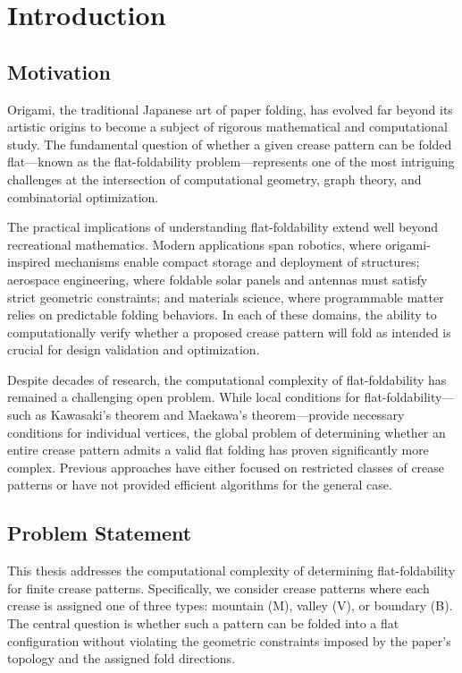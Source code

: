 \chapter{Introduction}

\section{Motivation}

Origami, the traditional Japanese art of paper folding, has evolved far beyond its artistic origins to become a subject of rigorous mathematical and computational study. The fundamental question of whether a given crease pattern can be folded flat—known as the flat-foldability problem—represents one of the most intriguing challenges at the intersection of computational geometry, graph theory, and combinatorial optimization.

The practical implications of understanding flat-foldability extend well beyond recreational mathematics. Modern applications span robotics, where origami-inspired mechanisms enable compact storage and deployment of structures; aerospace engineering, where foldable solar panels and antennas must satisfy strict geometric constraints; and materials science, where programmable matter relies on predictable folding behaviors. In each of these domains, the ability to computationally verify whether a proposed crease pattern will fold as intended is crucial for design validation and optimization.

Despite decades of research, the computational complexity of flat-foldability has remained a challenging open problem. While local conditions for flat-foldability—such as Kawasaki's theorem and Maekawa's theorem—provide necessary conditions for individual vertices, the global problem of determining whether an entire crease pattern admits a valid flat folding has proven significantly more complex. Previous approaches have either focused on restricted classes of crease patterns or have not provided efficient algorithms for the general case.

\section{Problem Statement}

This thesis addresses the computational complexity of determining flat-foldability for finite crease patterns. Specifically, we consider crease patterns where each crease is assigned one of three types: mountain (M), valley (V), or boundary (B). The central question is whether such a pattern can be folded into a flat configuration without violating the geometric constraints imposed by the paper's topology and the assigned fold directions.

